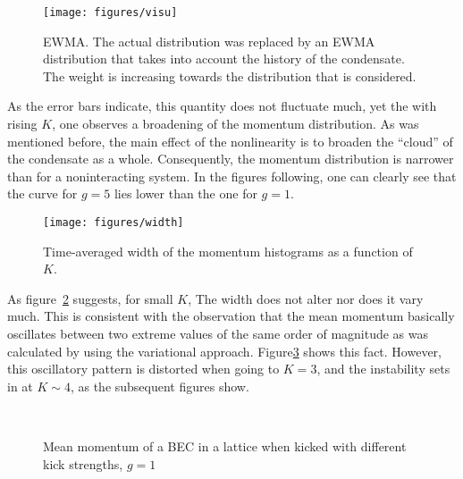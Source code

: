 \begin{figure}[H]
\begin{center}
\texttt{[image: figures/visu]}
\caption{EWMA. The actual distribution was replaced by an EWMA distribution that takes into account the history of the condensate. The weight is increasing towards the distribution that is considered.}
\label{fig:visu}
\end{center}
\end{figure}


As the error bars indicate, this quantity does not fluctuate much, yet the with rising $K$, one observes a broadening of the momentum distribution. As was mentioned before, the main effect of the nonlinearity is to broaden the ``cloud'' of the condensate as a whole. Consequently, the momentum distribution is narrower than for a noninteracting system. In the figures following, one can clearly see that the curve for $g=5$ lies lower than the one for $g=1$. 

\begin{figure}[H]
\begin{center}
\texttt{[image: figures/width]}
\caption{Time-averaged width of the momentum histograms as a function of $K$.}
\label{fig:width}
\end{center}
\end{figure}

As figure~\ref{fig:width} suggests, for small $K$, The width does not alter nor does it vary much. This is consistent with the
observation that the mean momentum basically oscillates between two extreme values of the same order of magnitude as was
calculated by using the variational approach. Figure\ref{fig:meanmomk2/3g1} shows this fact. However, this oscillatory pattern is distorted when
going to $K=3$, and the instability sets in at $K\sim 4$, as the subsequent figures show. 

\begin{figure}[H]
	\centering
	\mbox{
		}
	\caption{Mean momentum of a BEC in a lattice when kicked with different kick strengths, $g=1$}\label{fig:meanmomk2/3g1}
\end{figure}
	

